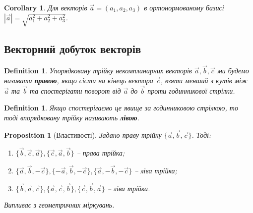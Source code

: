 \documentclass[a4paper, 10pt]{extarticle}
\theoremstyle{theoremdd}
\theoremstyle{theoremdd}
\newtheorem{definition}[theorem]{Definition}
\theoremstyle{theoremdd}
\theoremstyle{theoremdd}
\theoremstyle{theoremdd}
\newtheorem{proposition}[theorem]{Proposition}
\theoremstyle{theoremdd}
\theoremstyle{theoremdd}
\theoremstyle{theoremdd}
\newtheorem{corollary}[theorem]{Corollary}
\begin{document}
\begin{corollary}
	Для векторів $\vec{a} = (a_1, a_2, a_3)$ в ортонормованому базисі $|\vec{a}| = \sqrt{a_1^2 + a_2^2 + a_3^2}$.
\end{corollary}

\subsection{Векторний добуток векторів}
\begin{definition}
	Упорядковану трійку некомпланарних векторів $\vec{a}, \vec{b}, \vec{c}$ ми будемо називати \textbf{правою}, якщо сісти на кінець вектора $\vec{c}$, взяти менший з кутів між $\vec{a}$ та $\vec{b}$ та спостерігати поворот від $\vec{a}$ до $\vec{b}$ \textit{проти годинникової} стрілки.

\begin{figure}[H]
\centering
{}
\end{figure}
\end{definition}

\begin{definition}
	Якщо спостерігаємо це явище \textit{за годинниковою} стрілкою, то тоді впорядковану трійку називають \textbf{лівою}.
\begin{figure}[H]
\centering
{}
\end{figure}
\end{definition}

\begin{proposition}[Властивості]
	Задано праву трійку $\{\vec{a}, \vec{b}, \vec{c}\}$. Тоді:
	\begin{enumerate}[nosep,wide=0pt,label={\arabic*)}]
	\item $\{\vec{b}, \vec{c}, \vec{a}\}, \{\vec{c}, \vec{a}, \vec{b}\}$ -- права трійка;
	\item $\{\vec{a}, \vec{b}, -\vec{c}\}, \{-\vec{a}, \vec{b}, -\vec{c}\}, \{\vec{a}, -\vec{b}, -\vec{c}\}$ -- ліва трійка;
	\item $\{\vec{b}, \vec{a}, \vec{c}\}, \{\vec{a}, \vec{c}, \vec{b}\}, \{\vec{c}, \vec{b}, \vec{a}\}$ -- ліва трійка.
	\end{enumerate}
	\textit{Випливає з геометричних міркувань.}
\end{proposition}
\end{document}
